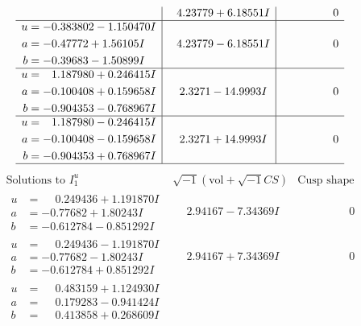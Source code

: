 \documentclass[1p]{elsarticle_modified}
\theoremstyle{definition}
\newcommand{\I}{\sqrt{-1}}
\begin{document}
$$\begin{array}{c|c|c}
 & \phantom{-}4.23779 + 6.18551 I & \phantom{-0.000000 } 0 \\ \hline\begin{aligned}
u &= -0.383802 - 1.150470 I \\
a &= -0.47772 + 1.56105 I \\
b &= -0.39683 - 1.50899 I\end{aligned}
 & \phantom{-}4.23779 - 6.18551 I & \phantom{-0.000000 } 0 \\ \hline\begin{aligned}
u &= \phantom{-}1.187980 + 0.246415 I \\
a &= -0.100408 + 0.159658 I \\
b &= -0.904353 - 0.768967 I\end{aligned}
 & \phantom{-}2.3271 - 14.9993 I & \phantom{-0.000000 } 0 \\ \hline\begin{aligned}
u &= \phantom{-}1.187980 - 0.246415 I \\
a &= -0.100408 - 0.159658 I \\
b &= -0.904353 + 0.768967 I\end{aligned}
 & \phantom{-}2.3271 + 14.9993 I & \phantom{-0.000000 } 0\\
 \hline 
 \end{array}$$\newpage$$\begin{array}{c|c|c}  
\text{Solutions to }I^u_{1}& \I (\text{vol} + \sqrt{-1}CS) & \text{Cusp shape}\\
 \hline 
\begin{aligned}
u &= \phantom{-}0.249436 + 1.191870 I \\
a &= -0.77682 + 1.80243 I \\
b &= -0.612784 - 0.851292 I\end{aligned}
 & \phantom{-}2.94167 - 7.34369 I & \phantom{-0.000000 } 0 \\ \hline\begin{aligned}
u &= \phantom{-}0.249436 - 1.191870 I \\
a &= -0.77682 - 1.80243 I \\
b &= -0.612784 + 0.851292 I\end{aligned}
 & \phantom{-}2.94167 + 7.34369 I & \phantom{-0.000000 } 0 \\ \hline\begin{aligned}
u &= \phantom{-}0.483159 + 1.124930 I \\
a &= \phantom{-}0.179283 - 0.941424 I \\
b &= \phantom{-}0.413858 + 0.268609 I\end{aligned}

\end{array}$$
\end{document}
